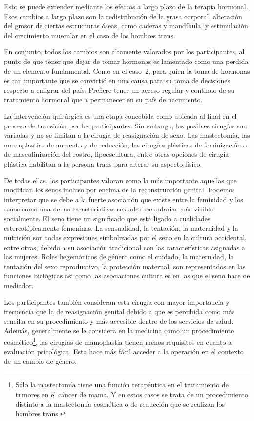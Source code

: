 Esto se puede extender mediante los efectos a largo plazo de la terapia
hormonal. Esos cambios a largo plazo son la redistribución de la grasa corporal,
alteración del grosor de ciertas estructuras óseas, como caderas y mandíbula, y
estimulación del crecimiento muscular en el caso de los hombres trans.

En conjunto, todos los cambios son altamente valorados por los participantes, al
punto de que tener que dejar de tomar hormonas es lamentado como una perdida de
un elemento fundamental. Como en el caso~2, para quien la toma de hormonas es
tan importante que se convirtió en una causa para su toma de decisiones respecto
a emigrar del país. Prefiere tener un acceso regular y continuo de su
tratamiento hormonal que a permanecer en su país de nacimiento.

La intervención quirúrgica es una etapa concebida como ubicada al final en el
proceso de transición por los participantes. Sin embargo, las posibles cirugías
son variadas y no se limitan a la cirugía de reasignación de sexo. Las
mastectomía, las mamoplastias de aumento y de reducción, las cirugías plásticas
de feminización o de masculinización del rostro, lipoescultura, entre otras
opciones de cirugía plástica habilitan a la persona trans para alterar su
aspecto físico.

De todas ellas, los participantes valoran como la más importante aquellas que
modifican los senos incluso por encima de la reconstrucción genital. Podemos
interpretar que se debe a la fuerte asociación que existe entre la feminidad y
los senos como una de las características sexuales secundarias más visible
socialmente. El seno tiene un significado que está ligado a cualidades
estereotípicamente femeninas. La sensualidad, la tentación, la maternidad y la
nutrición son todas expresiones simbolizadas por el seno en la cultura
occidental, entre otras, debido a su asociación tradicional con las
características asignadas a las mujeres. Roles hegemónicos de género como el
cuidado, la maternidad, la tentación del sexo reproductivo, la protección
maternal, son representados en las funciones biológicas así como las
asociaciones culturales en las que el seno hace de mediador.

Los participantes también consideran esta cirugía con mayor importancia y
frecuencia que la de reasignación genital debido a que es percibida como más
sencilla en su procedimiento y más accesible dentro de los servicios de salud.
Además, generalmente se le considera en la medicina como un procedimiento
cosmético\footnote{Sólo la mastectomía tiene una función terapéutica en el
tratamiento de tumores en el cáncer de mama. Y en estos casos se trata de un
procedimiento distinto a la mastectomía cosmética o de reducción que se realizan
los hombres trans.}, las cirugías de mamoplastia tienen menos requisitos en
cuanto a evaluación psicológica. Esto hace más fácil acceder a la operación en
el contexto de un cambio de género.


